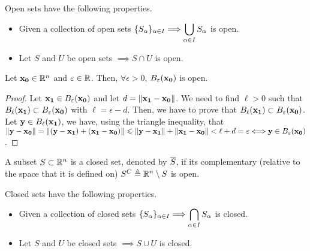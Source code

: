 \begin{prop}
    Open sets have the following properties.
    \begin{itemize}[itemsep = -2pt, topsep = -1pt]
        \item Given a collection of open sets $\{ S_\alpha \}_{\alpha\in I}\Longrightarrow\displaystyle\bigcup_{\alpha\in I} S_\alpha$ is open.
        \item Let $S$ and $U$ be open sets $\implies S\cap U$ is open.
    \end{itemize}
\end{prop}

\begin{prop}
    Let $\vec{x_0}\in\Rtn$ and $\epsilon\in\R$. Then, $\forall\epsilon > 0$, $\oball{\epsilon}{\vec{x_0}}$ is open.
\end{prop}

\begin{proof}
    Let $\vec{x_1}\in\oball{\epsilon}{\vec{x_0}}$ and let $d = \left\Vert \mathbf{x_1} - \mathbf{x_0} \right\Vert$. We need to find $\ell > 0$
    such that $\oball{\ell}{\vec{x_1}}\subset\oball{\epsilon}{\vec{x_0}}$ with $\ell = \epsilon - d$. Then, we have to
    prove that $\oball{\ell}{\vec{x_1}}\subset\oball{\epsilon}{\vec{x_0}}$. Let $\vec{y}\in\oball{\ell}{\vec{x_1}}$, we have,
    using the triangle inequality,
    that $\vnorm{\vec{y} - \vec{x_0}} = \vnorm{(\vec{y} - \vec{x_1}) + (\vec{x_1} - \vec{x_0})}\leq\vnorm{\vec{y} - 
    \vec{x_1}} + \vnorm{\vec{x_1} - \vec{x_0}} < \ell + d = \epsilon\iff\vec{y}\in\oball{\epsilon}{\vec{x_0}}$. 
\end{proof}

\begin{defn}\label{def:closed-set}
    A subset $S\subset\Rtn$ is a closed set, denoted by $\overline{S}$, if its complementary (relative to the space that 
    it is defined on) $S^C \bydef\Rtn\setminus S$ is open. 
\end{defn}

\begin{prop}
    Closed sets have the following properties.
    \begin{itemize}[itemsep = -2pt, topsep = -1pt]
        \item Given a collection of closed sets $\{ S_\alpha \}_{\alpha\in I}\Longrightarrow\displaystyle\bigcap_{\alpha\in I} 
            S_\alpha$ is closed.
        \item Let $S$ and $U$ be closed sets $\implies S\cup U$ is closed.
    \end{itemize}
\end{prop}

